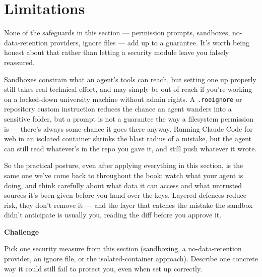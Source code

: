 \documentclass[
  letterpaper,
  DIV=11,
  numbers=noendperiod]{scrreprt}
\begin{document}
\chapter{Limitations}\label{limitations}

None of the safeguards in this section --- permission prompts,
sandboxes, no-data-retention providers, ignore files --- add up to a
guarantee. It's worth being honest about that rather than letting a
security module leave you falsely reassured.

Sandboxes constrain what an agent's tools can reach, but setting one up
properly still takes real technical effort, and may simply be out of
reach if you're working on a locked-down university machine without
admin rights. A \texttt{.rooignore} or repository custom instruction
reduces the chance an agent wanders into a sensitive folder, but a
prompt is not a guarantee the way a filesystem permission is --- there's
always some chance it goes there anyway. Running Claude Code for web in
an isolated container shrinks the blast radius of a mistake, but the
agent can still read whatever's in the repo you gave it, and still push
whatever it wrote.

So the practical posture, even after applying everything in this
section, is the same one we've come back to throughout the book: watch
what your agent is doing, and think carefully about what data it can
access and what untrusted sources it's been given before you hand over
the keys. Layered defences reduce risk, they don't remove it --- and the
layer that catches the mistake the sandbox didn't anticipate is usually
you, reading the diff before you approve it.

\begin{tcolorbox}[enhanced jigsaw, toprule=.15mm, rightrule=.15mm, left=2mm, leftrule=.75mm, breakable, opacityback=0, arc=.35mm, colframe=quarto-callout-important-color-frame, bottomrule=.15mm, colback=white]
\begin{minipage}[t]{5.5mm}
\textcolor{quarto-callout-important-color}{\faExclamation}
\end{minipage}%
\begin{minipage}[t]{\textwidth - 5.5mm}

\vspace{-3mm}\textbf{Challenge}\vspace{3mm}

Pick one security measure from this section (sandboxing, a
no-data-retention provider, an ignore file, or the isolated-container
approach). Describe one concrete way it could still fail to protect you,
even when set up correctly.

\end{minipage}%
\end{tcolorbox}
\end{document}
